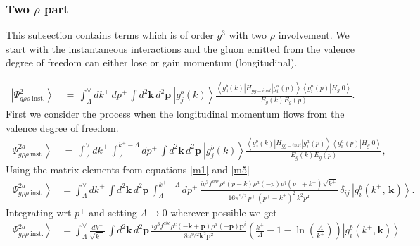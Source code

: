 \documentclass[aps,prd,amsmath,amssymb,nofootinbib]{revtex4-2}
\numberwithin{equation}{section}
\begin{document}
\subsubsection{Two $\rho$ part}
This subsection contains terms which is of order $g^{3}$ with two $\rho$ involvement. We start with the instantaneous interactions and the gluon emitted from the valence degree of freedom can either lose or gain momentum (longitudinal). 
\begin{figure}[h]
    \label{fig:4}
\end{figure}
\begin{align}\label{koa}
\left|\Psi_{g\rho\rho\:\text{inst.}}^{2}\right\rangle \,& = \,\int_{\Lambda}^{\vee}dk^{+}\,dp^{+}\,\int d^{2}\mathbf{k}\,d^{2}\mathbf{p}\:\left|g_{j}^{b}(k)\right\rangle \frac{\left\langle g_{j}^{b}(k)\left|H_{gg-inst}\right|g_{i}^{a}(p)\right\rangle \left\langle g_{i}^{a}(p)\left|H_{g}\right|0\right\rangle }{E_{g}(k)E_{g}(p)}.
\end{align}
First we consider the process when the longitudinal momentum flows from the valence degree of freedom.
\begin{align}\label{gthreed}
\left|\Psi_{g\rho\rho\:\text{inst.}}^{2a}\right\rangle \,& = \,\int_{\Lambda}^{\vee}dk^{+}\,\int_{\Lambda}^{k^{+}-\Lambda}dp^{+}\,\int d^{2}\mathbf{k}\, d^{2}\mathbf{p}\:\left|g_{j}^{b}(k)\right\rangle \frac{\left\langle g_{j}^{b}(k)\left|H_{gg-inst}\right|g_{i}^{a}(p)\right\rangle \left\langle g_{i}^{a}(p)\left|H_{g}\right|0\right\rangle }{E_{g}(k)E_{g}(p)},
\end{align}
Using the matrix elements from equations \eqref{m1} and  \eqref{m5}
\begin{align}\label{instgg}
\left|\Psi_{g\rho\rho\:\text{inst.}}^{2a}\right\rangle & =\int_{\Lambda}^{\vee}dk^{+}\,\int d^{2}\mathbf{k}\, d^{2}\mathbf{p}\,\int_{\Lambda}^{k^{+}-\Lambda} dp^{+}\, \frac{ig^{3}f^{abc}\rho^{c}(p-k)\rho^{a}(-p)p^{j}(p^{+}+k^{+})\sqrt{k^{+}}}{16\pi^{9/2}\, p^{+}\,(p^{+}-k^{+})^{2}\, k^{2}p^{2}}\,\delta_{ij}\,\left|g_{i}^{b}( k^{+},\,\mathbf{k})\right\rangle.
\end{align}
Integrating wrt $p^{+}$ and setting $\Lambda \rightarrow 0$ wherever possible we get
\begin{align}
  \left|\Psi_{g\rho\rho\:\text{inst.}}^{2a}\right\rangle & =  \int_{\Lambda}^{\vee}\frac{dk^{+}}{\sqrt{k^{+}}}\,\int d^{2}\mathbf{k}\, d^{2}\mathbf{p}\,\frac{ig^{3}f^{abc}\rho^{c}(-\mathbf{k}+\mathbf{p})\rho^{a}(-\mathbf{p})\mathbf{p}^{i}}{8\pi^{9/2} \mathbf{k}^{2}\mathbf{p}^{2}}\left(\frac{k^{+}}{\Lambda}-1-\ln\left(\frac{\Lambda}{k^{+}}\right)\right)\left|g_{i}^{b}(k^{+},\mathbf{k})\right\rangle
\end{align}
\end{document}
